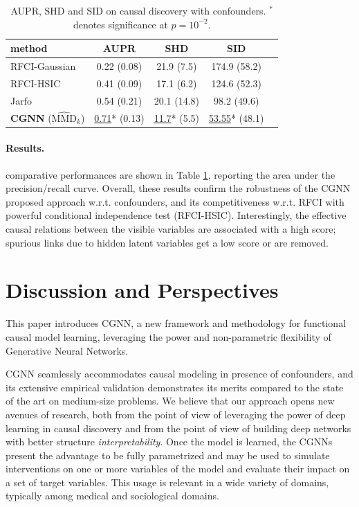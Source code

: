 \documentclass[a4paper, 11pt]{article}
\begin{document}
\begin{table}[h!]
\footnotesize
  \caption{AUPR, SHD and SID on causal discovery with confounders. $^*$ denotes significance at $p=10^{-2}$.}
  \centering
  \begin{tabular}{lcccr}
    \toprule
    method & AUPR &  SHD & SID \\
    \midrule
    RFCI-Gaussian & 0.22 (0.08) & 21.9 (7.5) & 174.9 (58.2) \\
    RFCI-HSIC & 0.41 (0.09) & 17.1 (6.2) & 124.6 (52.3) \\
    Jarfo & 0.54 (0.21) & 20.1 (14.8) & 98.2 (49.6) \\
    \midrule
    \textbf{CGNN} ($\widehat{\text{MMD}}_k$) & \underline{0.71}* (0.13) & \underline{11.7}* (5.5) & \underline{53.55}* (48.1)\\
    \bottomrule
  \end{tabular}
  \label{table:acc_graph_confounder}
\end{table} 

\paragraph{Results.} comparative performances are shown in Table \ref{table:acc_graph_confounder}, reporting the area under the precision/recall curve. Overall, these results confirm the robustness of the CGNN proposed approach w.r.t. confounders, and its competitiveness w.r.t. RFCI with powerful conditional independence test (RFCI-HSIC). Interestingly, the effective causal relations between the visible variables are associated with a high score; spurious links due to hidden latent variables get a low score or are removed.

\section{Discussion and Perspectives \label{discussion}}

This paper introduces CGNN, a new framework and methodology for functional causal model learning, leveraging the power and non-parametric flexibility of Generative Neural Networks. 

CGNN seamlessly accommodates causal modeling in presence of confounders, and its extensive empirical validation demonstrates its merits compared to the state of the art on medium-size problems. We believe that our approach opens new avenues of research, both from the point of view of leveraging the power of deep learning in causal discovery and from the point of view of building deep networks with better structure \textit{interpretability}. Once the model is learned, the CGNNs present the advantage to be fully parametrized and may be used to simulate interventions on one or more variables of the model and evaluate their impact on a set of target variables. This usage is relevant in a wide variety of domains, typically among medical and sociological domains.
\end{document}
